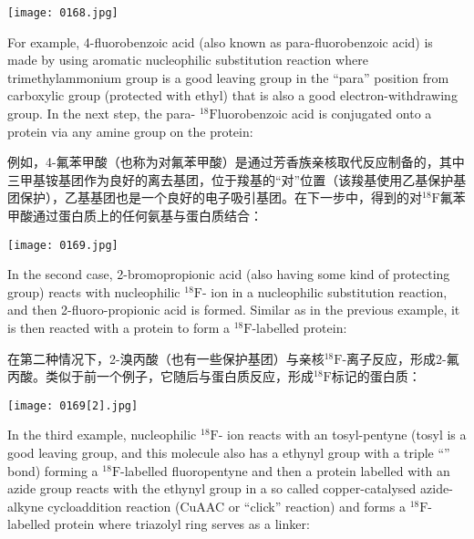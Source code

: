 \documentclass[dvipsnames, svgnames,a4paper,11pt]{article}
\begin{document}
\begin{figure*}[h]
	\centering
    \texttt{[image: 0168.jpg]}    
\end{figure*}

For example, 4-fluorobenzoic acid (also known as para-fluorobenzoic acid) is made
by using aromatic nucleophilic substitution reaction where trimethylammonium group
is a good leaving group in the “para” position from carboxylic group (protected with
ethyl) that is also a good electron-withdrawing group. In the next step, the para-
${}^\mathrm{18}\mathrm{F}$luorobenzoic acid is conjugated onto a protein via any amine group on the protein:

例如，4-氟苯甲酸（也称为对氟苯甲酸）是通过芳香族亲核取代反应制备的，其中三甲基铵基团作为良好的离去基团，位于羧基的“对”位置（该羧基使用乙基保护基团保护），乙基基团也是一个良好的电子吸引基团。在下一步中，得到的对${}^\mathrm{18}\mathrm{F}$氟苯甲酸通过蛋白质上的任何氨基与蛋白质结合：

\begin{figure*}[h]
	\centering
    \texttt{[image: 0169.jpg]}    
\end{figure*}

In the second case, 2-bromopropionic acid (also having some kind of protecting
group) reacts with nucleophilic ${}^\mathrm{18}\mathrm{F}$- ion in a nucleophilic substitution reaction, and
then 2-fluoro-propionic acid is formed. Similar as in the previous example, it is then
reacted with a protein to form a ${}^\mathrm{18}\mathrm{F}$-labelled protein:

在第二种情况下，2-溴丙酸（也有一些保护基团）与亲核${}^\mathrm{18}\mathrm{F}$-离子反应，形成2-氟丙酸。类似于前一个例子，它随后与蛋白质反应，形成${}^\mathrm{18}\mathrm{F}$标记的蛋白质：

\begin{figure*}[h]
	\centering
    \texttt{[image: 0169[2].jpg]}    
\end{figure*}

In the third example, nucleophilic ${}^\mathrm{18}\mathrm{F}$- ion reacts with an tosyl-pentyne (tosyl is a
good leaving group, and this molecule also has a ethynyl group with a triple “”
bond) forming a ${}^\mathrm{18}\mathrm{F}$-labelled fluoropentyne and then a protein labelled with an azide
group reacts with the ethynyl group in a so called copper-catalysed azide-alkyne
cycloaddition reaction (CuAAC or “click” reaction) and forms a ${}^\mathrm{18}\mathrm{F}$-labelled protein
where triazolyl ring serves as a linker:
\end{document}
